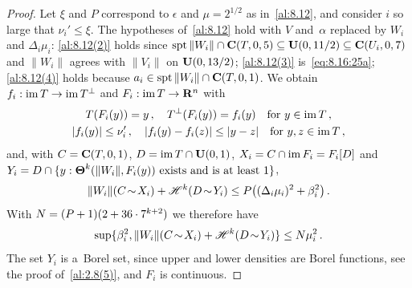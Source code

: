 \begin{proof}
    Let $\xi$ and $P$ correspond to $\epsilon$ and $\mu = 2^{1/2}$ as in~\ref{al:8.12}, and
    consider $i$ so large that $\nu_i' \le \xi$. The hypotheses of~\ref{al:8.12} hold with $V$
    and~$\alpha$ replaced by $W_i$ and $\Delta_i \mu_i$: \ref{al:8.12(2)} holds since $\operatorname{spt} \|W_i\|
    \cap \mathbf{C} ( T, 0, 5 ) \subseteq \mathbf{U}(0,11/2) \subseteq \mathbf{C} ( U_i, 0, 7 )$ and $\|W_i\|$
    agrees with $\|V_i\|$ on $\mathbf{U}(0,13/2)$; \ref{al:8.12(3)} is~\eqref{eq:8.16:25a};
    \ref{al:8.12(4)} holds because $a_i \in \operatorname{spt} \|W_i\| \cap \mathbf{C} ( T, 0, 1 )$. We obtain $f_i :
    \operatorname{im} T \to \operatorname{im} T^\perp$ and $F_i : \operatorname{im} T \to \mathbf{R}^{n}$ with
    \begin{gather}
        \label{eq:8.16:27}
        T(F_i(y)) = y \,, \quad T^\perp(F_i(y)) = f_i(y) \quad \text{for $y \in \operatorname{im} T$} \,, \\
        \label{eq:8.16:28}
        |f_i(y)| \le \nu_i' \,, \quad |f_i(y) - f_i(z)| \le |y - z| \quad \text{for $y, z \in \operatorname{im}
        T$} \,,
    \end{gather}
    and, with $C = \mathbf{C} ( T, 0, 1 )$, $D = \operatorname{im} T \cap \mathbf{U}(0,1)$, $X_i = C \cap \operatorname{im} F_i =
    F_i[D]$ and $Y_i = D \cap \{ y : \boldsymbol{\Theta}^{k}(\|W_i\|,F_i(y)) \text{ exists and is at least
    } 1 \}$,
    \begin{equation}
        \label{eq:8.16:30}
        \|W_i\|(C \!\sim\! X_i) + \mathscr{H}^{k}(D \!\sim\! Y_i) \le P \big( (\Delta_i \mu_i)^2 +
        \beta_i^2 \big) \,.
    \end{equation}
    With $N = (P + 1)(2 + 36 \cdot 7^{k+2})$ we therefore have
    \begin{equation}
        \label{eq:8.16:33}
        \sup \{ \beta_i^2, \|W_i\|(C \!\sim\! X_i) + \mathscr{H}^{k}(D \!\sim\! Y_i) \} \le N \mu_i^2
        \,.
    \end{equation}
    The set $Y_i$ is a~Borel set, since upper and lower densities are Borel functions, see the
    proof of~\ref{al:2.8(5)}, and $F_i$ is continuous.


\end{proof}
